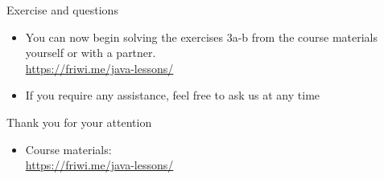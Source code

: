 \begin{frame}[fragile]{Exercise and questions}
    \begin{itemize}
    \item You can now begin solving the exercises 3a-b from the course materials yourself or with a partner. \\
        \url{https://friwi.me/java-lessons/}
    \item If you require any assistance, feel free to ask us at any time
    \end{itemize}
\end{frame}

\begin{frame}[fragile]{Thank you for your attention}
    \begin{itemize}
    \item Course materials: \\
        \url{https://friwi.me/java-lessons/}
    \end{itemize}
\end{frame}

